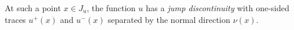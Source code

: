 \begin{appendices}
\begin{definition}
At such a point $x \in J_u$, the function $u$ has a \emph{jump discontinuity} with one-sided traces $u^+(x)$ and $u^-(x)$ separated by the normal direction $\nu(x)$.  
\end{definition}

\newpage %
\end{appendices}